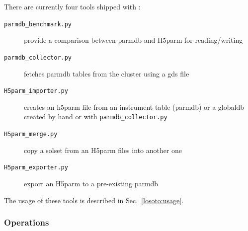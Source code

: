 \documentclass[]{article}
\begin{document}
There are currently four tools shipped with \losoto{}:
\begin{description}
 \item[\texttt{parmdb\_benchmark.py}] provide a comparison between parmdb and H5parm for reading/writing
 \item[\texttt{parmdb\_collector.py}] fetches parmdb tables from the cluster using a gds file
 \item[\texttt{H5parm\_importer.py}] creates an h5parm file from an instrument table (parmdb) or a globaldb created by hand or with \texttt{parmdb\_collector.py}
 \item[\texttt{H5parm\_merge.py}] copy a solset from an H5parm files into another one
 \item[\texttt{H5parm\_exporter.py}] export an H5parm to a pre-existing parmdb
\end{description}

The usage of these tools is described in Sec.~\ref{losoto:usage}.

\subsubsection{Operations}
\label{losoto:operations}
\end{document}
